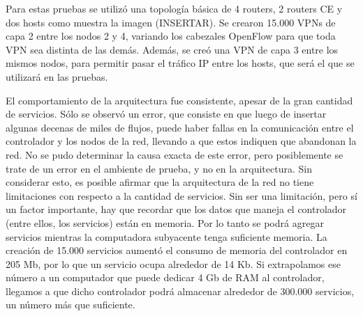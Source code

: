 \documentclass[a4paper,12pt]{report}
\begin{document}
Para estas pruebas se utilizó una topología básica de 4 routers, 2 routers CE y dos hosts como muestra la imagen (INSERTAR). Se crearon 15.000 VPNs de capa 2 entre los nodos 2 y 4, variando los cabezales OpenFlow para que toda VPN sea distinta de las demás. Además, se creó una VPN de capa 3 entre los mismos nodos, para permitir pasar el tráfico IP entre los hosts, que será el que se utilizará en las pruebas.

El comportamiento de la arquitectura fue consistente, apesar de la gran cantidad de servicios. Sólo se observó un error, que consiste en que luego de insertar algunas decenas de miles de flujos, puede haber fallas en la comunicación entre el controlador y los nodos de la red, llevando a que estos indiquen que abandonan la red. No se pudo determinar la causa exacta de este error, pero posiblemente se trate de un error en el ambiente de prueba, y no en la arquitectura. Sin considerar esto, es posible afirmar que la arquitectura de la red no tiene limitaciones con respecto a la cantidad de servicios. Sin ser una limitación, pero sí un factor importante, hay que recordar que los datos que maneja el controlador (entre ellos, los servicios) están en memoria. Por lo tanto se podrá agregar servicios mientras la computadora subyacente tenga suficiente memoria. La creación de 15.000 servicios aumentó el consumo de memoria del controlador en 205 Mb, por lo que un servicio ocupa alrededor de 14 Kb. Si extrapolamos ese número a un computador que puede dedicar 4 Gb de RAM al controlador, llegamos a que dicho controlador podrá almacenar alrededor de 300.000 servicios, un número más que suficiente.
\end{document}
